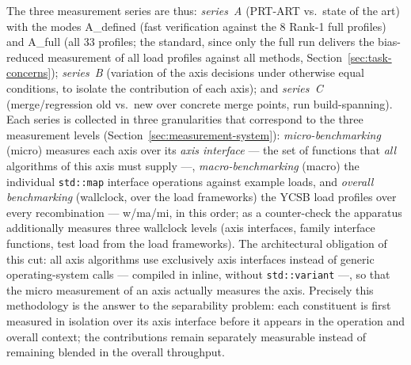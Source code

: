 \begin{nurkurz}
The three measurement series are thus: \emph{series~A} (PRT-ART vs.\ state of the art) with the modes
A\_defined (fast verification against the 8 Rank-1 full profiles) and A\_full (all 33 profiles; the
standard, since only the full run delivers the bias-reduced measurement of all load profiles against
all methods, Section~\ref{sec:task-concerns}); \emph{series~B} (variation of the axis decisions under
otherwise equal conditions, to isolate the contribution of each axis); and \emph{series~C}
(merge/regression old vs.\ new over concrete merge points, run build-spanning). Each series is
collected in three granularities that correspond to the three measurement levels
(Section~\ref{sec:measurement-system}): \emph{micro-benchmarking} (micro) measures each axis over its
\emph{axis interface} --- the set of functions that \emph{all} algorithms of this axis must supply ---,
\emph{macro-benchmarking} (macro) the individual \texttt{std::map} interface operations against example
loads, and \emph{overall benchmarking} (wallclock, over the load frameworks) the YCSB load profiles over
every recombination --- w/ma/mi, in this order; as a counter-check the apparatus additionally measures
three wallclock levels (axis interfaces, family interface functions, test load from the load
frameworks). The architectural obligation of this cut: all axis algorithms use exclusively axis
interfaces instead of generic operating-system calls --- compiled in inline, without
\texttt{std::variant} ---, so that the micro measurement of an axis actually measures the axis.
Precisely this methodology is the answer to the separability problem: each constituent is first
measured in isolation over its axis interface before it appears in the operation and overall context;
the contributions remain separately measurable instead of remaining blended in the overall throughput.


\end{nurkurz}

